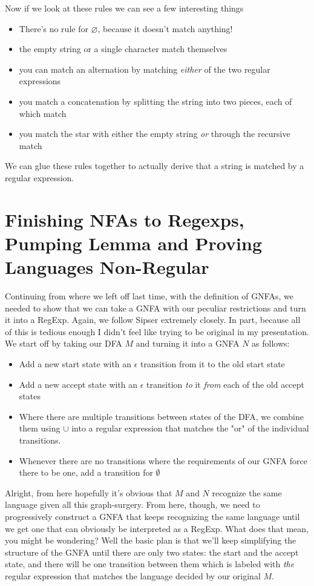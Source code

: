 \documentclass[11pt]{article}
\begin{document}
Now if we look at these rules we can see a few interesting things

\begin{itemize}
\item There's no rule for $\varnothing$, because it doesn't match anything!
\item the empty string or a single character match themselves
\item you can match an alternation by matching \emph{either} of the two regular expressions
\item you match a concatenation by splitting the string into two pieces, each of which match
\item you match the star with either the empty string \emph{or} through the recursive match
\end{itemize}

We can glue these rules together to actually derive that a string is matched by a regular expression.

\section{Finishing NFAs to Regexps, Pumping Lemma and Proving Languages Non-Regular}
\label{sec-6}
Continuing from where we left off last time, with the definition of GNFAs, we needed to show that we can take a GNFA with our peculiar restrictions and turn it into a RegExp. Again, we follow Sipser extremely closely. In part, because all of this is tedious enough I didn't feel like trying to be original in my presentation. We start off by taking our DFA $M$ and turning it into a GNFA $N$ as follows: 

\begin{itemize}
\item Add a new start state with an $\epsilon$ transition from it to the old start state
\item Add a new accept state with an $\epsilon$ transition \emph{to} it \emph{from} each of the old accept states
\item Where there are multiple transitions between states of the DFA, we combine them using $\cup$ into a regular expression that matches the "or" of the individual transitions.
\item Whenever there are no transitions where the requirements of our GNFA force there to be one, add a transition for $\emptyset$
\end{itemize}

Alright, from here hopefully it's obvious that $M$ and $N$ recognize the same language given all this graph-surgery. From here, though, we need to progressively construct a GNFA that keeps recognizing the same language until we get one that can obviously be interpreted as a RegExp. What does that mean, you might be wondering? Well the basic plan is that we'll keep simplifying the structure of the GNFA until there are only two states: the start and the accept state, and there will be one transition between them which is labeled with \emph{the} regular expression that matches the language decided by our original $M$.
\end{document}
